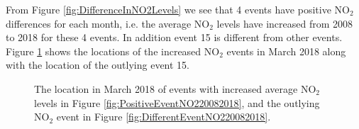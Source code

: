 \documentclass[a4paper,11pt]{article}
\begin{document}
From Figure \ref{fig:DifferenceInNO2Levels} we see that 4 events have positive $\text{NO}_2$ differences for each month, i.e. the average $\text{NO}_2$ levels have increased from 2008 to 2018 for these 4 events. In addition event 15 is different from other events. Figure \ref{fig:PositiveDifferentEventsNO220082018} shows the locations of the increased $\text{NO}_2$ events in March 2018 along with the location of the outlying event 15.

\begin{figure}[H]
	\centering
	\caption{\footnotesize The location in March 2018 of events with increased average $\text{NO}_2$ levels in Figure \ref{fig:PositiveEventNO220082018}, and the outlying $\text{NO}_2$ event in Figure \ref{fig:DifferentEventNO220082018}. }
	\label{fig:PositiveDifferentEventsNO220082018}
\end{figure}
\end{document}
